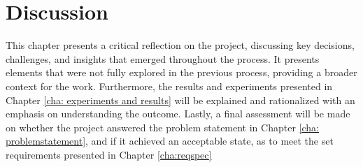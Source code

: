 \chapter{Discussion} \label{cha: discussion}
This chapter presents a critical reflection on the project, discussing key decisions, challenges, and insights that emerged throughout the process. It presents elements that were not fully explored in the previous process, providing a broader context for the work. Furthermore, the results and experiments presented in Chapter \ref{cha: experiments and results} will be explained and rationalized with an emphasis on understanding the outcome. Lastly, a final assessment will be made on whether the project answered the problem statement in Chapter \ref{cha: problemstatement}, and if it achieved an acceptable state, as to meet the set requirements presented in Chapter \ref{cha:reqspec}

